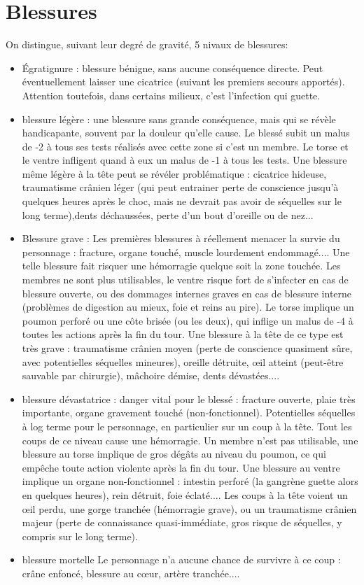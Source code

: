 \documentclass[10pt,a4paper,twocolumn]{book}
\begin{document}
\section{Blessures}
On distingue, suivant leur degré de gravité, 5 nivaux de blessures:
\begin{itemize}
\item \'Egratignure : blessure bénigne, sans aucune conséquence directe. Peut éventuellement laisser une cicatrice (suivant les premiers secours apportés). Attention toutefois, dans certains milieux, c'est l'infection qui guette.
\item blessure légère : une blessure sans grande conséquence, mais qui se révèle handicapante, souvent par la douleur qu'elle cause. Le blessé subit un malus de -2 à tous ses tests réalisés avec cette zone si c'est un membre. Le torse et le ventre infligent quand à eux un malus de -1 à tous les tests. Une blessure même légère à la tête peut se révéler problématique : cicatrice hideuse, traumatisme crânien léger (qui peut entrainer perte de conscience jusqu'à quelques heures après le choc, mais ne devrait pas avoir de séquelles sur le long terme),dents déchaussées, perte d'un bout d'oreille ou de nez...
\item Blessure grave : Les premières blessures à réellement menacer la survie du personnage : fracture, organe touché, muscle lourdement endommagé.... Une telle blessure fait risquer une hémorragie quelque soit la zone touchée. Les membres ne sont plus utilisables, le ventre risque fort de s'infecter en cas de blessure ouverte, ou des dommages internes graves en cas de blessure interne (problèmes de digestion au mieux, foie et reins au pire). Le torse implique un poumon perforé ou une côte brisée (ou les deux), qui inflige un malus de -4 à toutes les actions après la fin du tour. Une blessure à la tête de ce type est très grave : traumatisme crânien moyen (perte de conscience quasiment sûre, avec potentielles séquelles mineures), oreille détruite, œil atteint (peut-être sauvable par chirurgie), mâchoire démise, dents dévastées....
\item blessure dévastatrice : danger vital pour le blessé : fracture ouverte, plaie très importante, organe gravement touché (non-fonctionnel). Potentielles séquelles à log terme pour le personnage, en particulier sur un coup à la tête. Tout les coups de ce niveau cause une hémorragie. Un membre n'est pas utilisable, une blessure au torse implique de gros dégâts au niveau du poumon, ce qui empêche toute action violente après la fin du tour. Une blessure au ventre implique un organe non-fonctionnel : intestin perforé (la gangrène guette alors en quelques heures), rein détruit, foie éclaté.... Les coups à la tête voient un œil perdu, une gorge tranchée (hémorragie grave), ou un traumatisme crânien majeur (perte de connaissance quasi-immédiate, gros risque de séquelles, y compris sur le long terme).
\item blessure mortelle Le personnage n'a aucune chance de survivre à ce coup : crâne enfoncé, blessure au cœur, artère tranchée....
\end{itemize}
\end{document}
